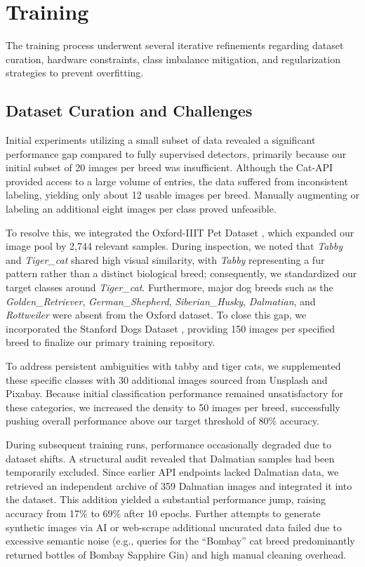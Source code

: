 \section{Training}
\label{sec:training}

The training process underwent several iterative refinements regarding dataset curation, hardware constraints, class imbalance mitigation, and regularization strategies to prevent overfitting.

\subsection{Dataset Curation and Challenges}
Initial experiments utilizing a small subset of data revealed a significant performance gap compared to fully supervised detectors, primarily because our initial subset of 20 images per breed was insufficient. Although the Cat-API provided access to a large volume of entries, the data suffered from inconsistent labeling, yielding only about 12 usable images per breed. Manually augmenting or labeling an additional eight images per class proved unfeasible. 

To resolve this, we integrated the Oxford-IIIT Pet Dataset \cite{parkhi2012catsdogs}, which expanded our image pool by 2,744 relevant samples. During inspection, we noted that \textit{Tabby} and \textit{Tiger\_cat} shared high visual similarity, with \textit{Tabby} representing a fur pattern rather than a distinct biological breed; consequently, we standardized our target classes around \textit{Tiger\_cat}. Furthermore, major dog breeds such as the \textit{Golden\_Retriever}, \textit{German\_Shepherd}, \textit{Siberian\_Husky}, \textit{Dalmatian}, and \textit{Rottweiler} were absent from the Oxford dataset. To close this gap, we incorporated the Stanford Dogs Dataset \cite{khosla2011novel}, providing 150 images per specified breed to finalize our primary training repository.

To address persistent ambiguities with tabby and tiger cats, we supplemented these specific classes with 30 additional images sourced from Unsplash and Pixabay. Because initial classification performance remained unsatisfactory for these categories, we increased the density to 50 images per breed, successfully pushing overall performance above our target threshold of 80\% accuracy.

During subsequent training runs, performance occasionally degraded due to dataset shifts. A structural audit revealed that Dalmatian samples had been temporarily excluded. Since earlier API endpoints lacked Dalmatian data, we retrieved an independent archive of 359 Dalmatian images and integrated it into the dataset. This addition yielded a substantial performance jump, raising accuracy from 17\% to 69\% after 10 epochs. Further attempts to generate synthetic images via AI or web-scrape additional uncurated data failed due to excessive semantic noise (e.g., queries for the ``Bombay'' cat breed predominantly returned bottles of Bombay Sapphire Gin) and high manual cleaning overhead.

